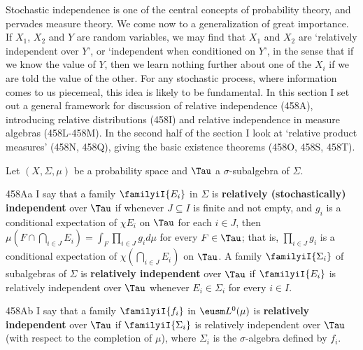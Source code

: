 
\def\chaptername{Perfect measures, disintegrations and processes}
\def\sectionname{Relative independence and relative products}


Stochastic independence is one of the central concepts of probability
theory, and pervades measure theory.   We come now to a generalization
of great importance.   If $X_1$, $X_2$ and $Y$ are random
variables, we may find that $X_1$ and $X_2$ are `relatively independent
over $Y$', or `independent when conditioned on $Y$', in the sense that
if we know the value of $Y$, then we learn nothing further about one of
the $X_i$ if we are told the value of the other.   For any stochastic
process, where information comes to us piecemeal, this idea is likely to
be fundamental.   In this section I set out a general framework for
discussion of relative independence (458A), introducing relative
distributions (458I) and relative independence in measure algebras
(458L-458M).   In the second half of the section I look at
`relative product measures'
(458N, 458Q), giving the basic existence theorems (458O, 458S, 458T).

 Let
$(X,\Sigma,\mu)$ be a probability space and $\Tau$ a $\sigma$-subalgebra
of $\Sigma$.

\spheader 458Aa I say that a family $\familyiI{E_i}$ in $\Sigma$ is
{\bf relatively (stochastically)
independent} over $\Tau$ if whenever $J\subseteq I$ is finite and not
empty, and $g_i$ is a conditional expectation of
$\chi E_i$ on $\Tau$ for each $i\in J$,
then $\mu(F\cap\bigcap_{i\in J}E_i)=\int_F\prod_{i\in J}g_id\mu$ for every
$F\in\Tau$;  that is, $\prod_{i\in J}g_i$ is a conditional expectation of
$\chi(\bigcap_{i\in J}E_i)$ on $\Tau$.
A family $\familyiI{\Sigma_i}$ of
subalgebras of $\Sigma$ is {\bf relatively independent} over
$\Tau$ if $\familyiI{E_i}$ is relatively independent over $\Tau$
whenever $E_i\in\Sigma_i$ for every $i\in I$.

\spheader 458Ab I say that a family $\familyiI{f_i}$ in
$\eusm L^0(\mu)$ is
{\bf relatively independent} over $\Tau$ if
$\familyiI{\Sigma_i}$ is relatively independent over $\Tau$ (with
respect to the completion of $\mu$), where $\Sigma_i$ is the
$\sigma$-algebra defined by $f_i$.

